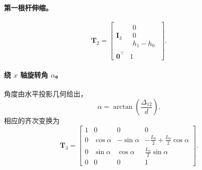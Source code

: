 \documentclass[12pt,a4paper]{article}
\begin{document}
\paragraph{第一根杆伸缩。}
\begin{equation}
  \bm T_2 = \begin{bmatrix}
    \bm I_3 & \begin{matrix}0\\0\\h_1 - h_0\end{matrix} \\
    \bm 0^\top & 1
  \end{bmatrix}.
\end{equation}

\paragraph{绕 $x$ 轴旋转角 $\alpha$。} 
角度由水平投影几何给出，
\begin{equation}
  \alpha = \arctan\left(\frac{\Delta_{12}}{d}\right).
\end{equation}
相应的齐次变换为
\begin{equation}
  \bm T_3 = \begin{bmatrix}
    1 & 0 & 0 & 0\\
    0 & \cos\alpha & -\sin\alpha & -\frac{L_0}{2} + \frac{L_0}{2}\cos\alpha\\
    0 & \sin\alpha & \cos\alpha & \frac{L_0}{2}\sin\alpha\\
    0 & 0 & 0 & 1
  \end{bmatrix}.
\end{equation}
\end{document}
